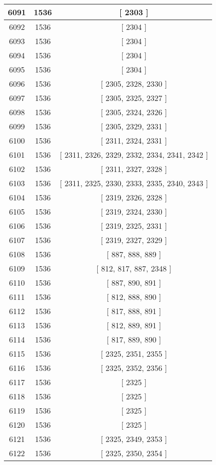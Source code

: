 \begin{center}
\begin{longtable}[H]{|| c c c ||}
\hline
6091 & 1536 & [ 2303 ] \\ 
\hline
6092 & 1536 & [ 2304 ] \\ 
\hline
6093 & 1536 & [ 2304 ] \\ 
\hline
6094 & 1536 & [ 2304 ] \\ 
\hline
6095 & 1536 & [ 2304 ] \\ 
\hline
6096 & 1536 & [ 2305, 2328, 2330 ] \\ 
\hline
6097 & 1536 & [ 2305, 2325, 2327 ] \\ 
\hline
6098 & 1536 & [ 2305, 2324, 2326 ] \\ 
\hline
6099 & 1536 & [ 2305, 2329, 2331 ] \\ 
\hline
6100 & 1536 & [ 2311, 2324, 2331 ] \\ 
\hline
6101 & 1536 & [ 2311, 2326, 2329, 2332, 2334, 2341, 2342 ] \\ 
\hline
6102 & 1536 & [ 2311, 2327, 2328 ] \\ 
\hline
6103 & 1536 & [ 2311, 2325, 2330, 2333, 2335, 2340, 2343 ] \\ 
\hline
6104 & 1536 & [ 2319, 2326, 2328 ] \\ 
\hline
6105 & 1536 & [ 2319, 2324, 2330 ] \\ 
\hline
6106 & 1536 & [ 2319, 2325, 2331 ] \\ 
\hline
6107 & 1536 & [ 2319, 2327, 2329 ] \\ 
\hline
6108 & 1536 & [ 887, 888, 889 ] \\ 
\hline
6109 & 1536 & [ 812, 817, 887, 2348 ] \\ 
\hline
6110 & 1536 & [ 887, 890, 891 ] \\ 
\hline
6111 & 1536 & [ 812, 888, 890 ] \\ 
\hline
6112 & 1536 & [ 817, 888, 891 ] \\ 
\hline
6113 & 1536 & [ 812, 889, 891 ] \\ 
\hline
6114 & 1536 & [ 817, 889, 890 ] \\ 
\hline
6115 & 1536 & [ 2325, 2351, 2355 ] \\ 
\hline
6116 & 1536 & [ 2325, 2352, 2356 ] \\ 
\hline
6117 & 1536 & [ 2325 ] \\ 
\hline
6118 & 1536 & [ 2325 ] \\ 
\hline
6119 & 1536 & [ 2325 ] \\ 
\hline
6120 & 1536 & [ 2325 ] \\ 
\hline
6121 & 1536 & [ 2325, 2349, 2353 ] \\ 
\hline
6122 & 1536 & [ 2325, 2350, 2354 ] \\ 

\end{longtable}
\end{center}
